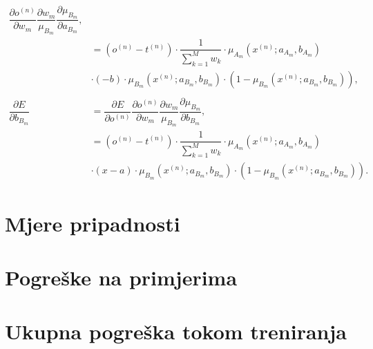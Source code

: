\documentclass[12pt, a4paper]{article}
\begin{document}
\begin{align*}
    \dfrac{\partial o^{(n)}}{\partial w_m}
    \dfrac{\partial w_m}{\mu_{B_m}}
    \dfrac{\partial \mu_{B_m}}{\partial a_{B_m}}, \\ &=
    \left( o^{(n)} - t^{(n)} \right) \cdot
    \dfrac{1}{\sum_{k=1}^{M} w_k} \cdot
    \mu_{A_m} \left( x^{(n)}; a_{A_m}, b_{A_m} \right) \\ &\cdot
    (-b) \cdot \mu_{B_m} \left( x^{(n)}; a_{B_m}, b_{B_m} \right) \cdot \left( 1 - \mu_{B_m} \left( x^{(n)}; a_{B_m}, b_{B_m} \right) \right), \\ \\
  \dfrac{\partial E}{\partial b_{B_m}} &= 
    \dfrac{\partial E}{\partial o^{(n)}} 
    \dfrac{\partial o^{(n)}}{\partial w_m}
    \dfrac{\partial w_m}{\mu_{B_m}}
    \dfrac{\partial \mu_{B_m}}{\partial b_{B_m}}, \\ &=
    \left( o^{(n)} - t^{(n)} \right) \cdot
    \dfrac{1}{\sum_{k=1}^{M} w_k} \cdot
    \mu_{A_m} \left( x^{(n)}; a_{A_m}, b_{A_m} \right) \\ &\cdot
    (x - a) \cdot \mu_{B_m} \left( x^{(n)}; a_{B_m}, b_{B_m} \right) \cdot \left( 1 - \mu_{B_m} \left( x^{(n)}; a_{B_m}, b_{B_m} \right) \right).
\end{align*}

\section*{Mjere pripadnosti}

\section*{Pogreške na primjerima}

\section*{Ukupna pogreška tokom treniranja}
\end{document}
